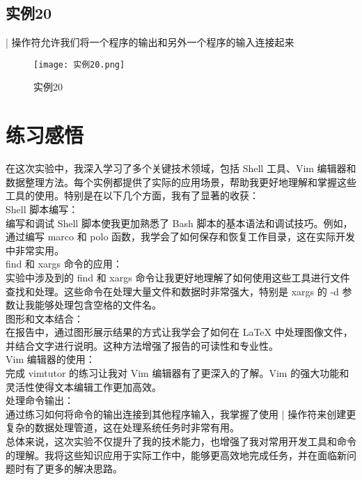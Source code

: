 \documentclass[a4paper, 12pt]{article}
\begin{document}
\subsection{实例20}
| 操作符允许我们将一个程序的输出和另外一个程序的输入连接起来

\begin{figure}[h!]
  \centering
  \texttt{[image: 实例20.png]}
  \caption{实例20}
\end{figure}

\section{练习感悟}
在这次实验中，我深入学习了多个关键技术领域，包括 Shell 工具、Vim 编辑器和数据整理方法。每个实例都提供了实际的应用场景，帮助我更好地理解和掌握这些工具的使用。特别是在以下几个方面，我有了显著的收获：\\

Shell 脚本编写：\\

编写和调试 Shell 脚本使我更加熟悉了 Bash 脚本的基本语法和调试技巧。例如，通过编写 marco 和 polo 函数，我学会了如何保存和恢复工作目录，这在实际开发中非常实用。\\

find 和 xargs 命令的应用：\\

实验中涉及到的 find 和 xargs 命令让我更好地理解了如何使用这些工具进行文件查找和处理。这些命令在处理大量文件和数据时非常强大，特别是 xargs 的 -d 参数让我能够处理包含空格的文件名。\\

图形和文本结合：\\

在报告中，通过图形展示结果的方式让我学会了如何在 LaTeX 中处理图像文件，并结合文字进行说明。这种方法增强了报告的可读性和专业性。\\

Vim 编辑器的使用：\\

完成 vimtutor 的练习让我对 Vim 编辑器有了更深入的了解。Vim 的强大功能和灵活性使得文本编辑工作更加高效。\\

处理命令输出：\\

通过练习如何将命令的输出连接到其他程序输入，我掌握了使用 | 操作符来创建更复杂的数据处理管道，这在处理系统任务时非常有用。\\

总体来说，这次实验不仅提升了我的技术能力，也增强了我对常用开发工具和命令的理解。我将这些知识应用于实际工作中，能够更高效地完成任务，并在面临新问题时有了更多的解决思路。\\
\end{document}
